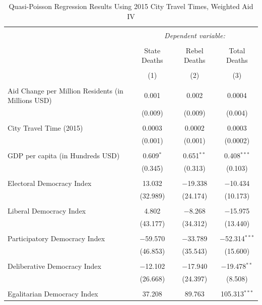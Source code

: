 \documentclass[12pt, letterpaper]{article}
\begin{document}
\begin{table}[!htbp] \centering 
	\caption{Quasi-Poisson Regression Results Using 2015 City Travel Times, Weighted Aid IV} 
	\begin{tabular}{@{\extracolsep{5pt}}lccc} 
		\\[-1.8ex]\hline 
		\hline \\[-1.8ex] 
		& \multicolumn{3}{c}{\textit{Dependent variable:}} \\ 
		\cline{2-4} 
		\\[-1.8ex] & State Deaths & Rebel Deaths & Total Deaths \\ 
		\\[-1.8ex] & (1) & (2) & (3)\\ 
		\hline \\[-1.8ex] 
		Aid Change per Million Residents (in Millions USD) & 0.001 & 0.002 & 0.0004 \\ 
		& (0.009) & (0.009) & (0.004) \\ 
		& & & \\ 
		City Travel Time (2015) & 0.0003 & 0.0002 & 0.0003 \\ 
		& (0.001) & (0.001) & (0.0002) \\ 
		& & & \\ 
		GDP per capita (in Hundreds USD) & 0.609$^{*}$ & 0.651$^{**}$ & 0.408$^{***}$ \\ 
		& (0.345) & (0.313) & (0.103) \\ 
		& & & \\ 
		Electoral Democracy Index & 13.032 & $-$19.338 & $-$10.434 \\ 
		& (32.989) & (24.174) & (10.173) \\ 
		& & & \\ 
		Liberal Democracy Index & 4.802 & $-$8.268 & $-$15.975 \\ 
		& (43.177) & (34.312) & (13.440) \\ 
		& & & \\ 
		Participatory Democracy Index & $-$59.570 & $-$33.789 & $-$52.314$^{***}$ \\ 
		& (46.853) & (35.543) & (15.600) \\ 
		& & & \\ 
		Deliberative Democracy Index & $-$12.102 & $-$17.940 & $-$19.478$^{**}$ \\ 
		& (26.668) & (24.397) & (8.508) \\ 
		& & & \\ 
		Egalitarian Democracy Index & 37.208 & 89.763 & 105.313$^{***}$ \\ 

\end{tabular}
\end{table}
\end{document}
